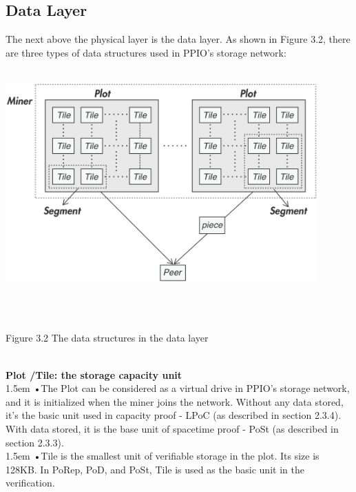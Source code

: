 \documentclass[10pt,a4paper]{article}
\begin{document}
        \subsection{Data Layer}  %
The next above the physical layer is the data layer. As shown in Figure 3.2, there are three types of data structures used in PPIO’s storage network:
\vspace{-1em}
\\\\
\centerline{\includegraphics[width=340pt]{fig12}}
\\\\ \centerline{{Figure 3.2 The data structures in the data layer}}
\vspace{-1.5em}
\\

\noindent   
{\bf Plot /Tile: the storage capacity unit}
\vspace{-0.8em}
\\

\hangindent 1.5em
\noindent   
•\quad The Plot can be considered as a virtual drive in PPIO’s storage network, and it is initialized when the miner joins the network. Without any data stored, it's the basic unit used in capacity proof - LPoC (as described in section 2.3.4). With data stored, it is the base unit of spacetime proof - PoSt (as described in section 2.3.3).
\vspace{-0.8em}
\\

\hangindent 1.5em
\noindent   
•\quad Tile is the smallest unit of verifiable storage in the plot. Its size is 128KB. In PoRep, PoD, and PoSt, Tile is used as the basic unit in the verification.
\vspace{-0.5em}
\\
\end{document}

